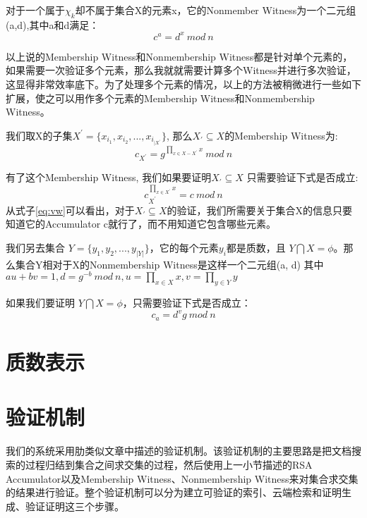对于一个属于$\chi_k$却不属于集合X的元素x，它的Nonmember Witness为一个二元组(a,d)\cite{li2007universal},其中a和d满足：
\begin{equation} c^a = d^x\ mod\ n\end{equation}

以上说的Membership Witness和Nonmembership Witness都是针对单个元素的，如果需要一次验证多个元素，那么我就就需要计算多个Witness并进行多次验证，这显得非常效率底下。为了处理多个元素的情况，以上的方法被稍微进行一些如下扩展，使之可以用作多个元素的Membership Witness和Nonmembership Witness。

我们取X的子集$X^{\prime} = \{x_{i_1}, x_{i_2}, ... , x_{i_{|X^\prime}}\}$, 那么$X_\prime \subseteq X$的Membership Witness为:
\begin{equation} \label{eq:w} c_{X^\prime} = g^{\prod_{x \in X - X^\prime} x}\ mod\ n \end{equation}

有了这个Membership Witness, 我们如果要证明$X_\prime \subseteq X$ 只需要验证下式是否成立:
\begin{equation} \label{eq:vw} c_{X^\prime}^{\prod_{x \in X^\prime} x} = c\ mod\ n\end{equation}
从式子\ref{eq:vw}可以看出，对于$X_\prime \subseteq X$的验证，我们所需要关于集合X的信息只要知道它的Accumulator c就行了，而不用知道它包含哪些元素。

我们另去集合 $Y = \{y_1, y_2, ... , y_{|Y|}\}$，它的每个元素$y_i$都是质数，且 $Y \bigcap X = \phi$。那么集合Y相对于X的Nonmembership Witness是这样一个二元组(a, d) 其中
$au + bv = 1, d = g^{-b}\ mod\ n, u = \prod_{x \in X} x, v = \prod_{y \in Y} y$

如果我们要证明 $Y \bigcap X = \phi$，只需要验证下式是否成立：
\begin{equation} \label{eq:vnw} c_a = d^v g\ mod\ n \end{equation}

\section{质数表示}

\section{验证机制}
我们的系统采用肋类似文章\cite{verifiableindex}中描述的验证机制。该验证机制的主要思路是把文档搜索的过程归结到集合之间求交集的过程，然后使用上一小节描述的RSA Accumulator以及Membership Witness、Nonmembership Witness来对集合求交集的结果进行验证。整个验证机制可以分为建立可验证的索引、云端检索和证明生成、验证证明这三个步骤。


